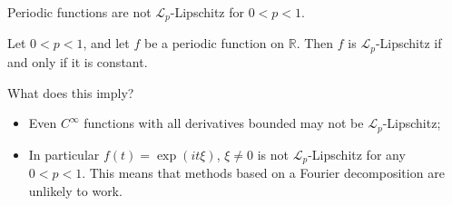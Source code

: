 \documentclass{beamer}
\numberwithin{equation}{section}
\theoremstyle{plain}
\theoremstyle{plain}
\theoremstyle{definition}
\theoremstyle{plain}
\theoremstyle{plain}
\theoremstyle{definition}
\newcommand{\Rl}{\mathbb{R}}
\newcommand{\Itgr}{\mathbb{Z}}
\newcommand{\Circ}{\mathbb{T}}
\newcommand{\Lc}{\mathcal{L}}
\begin{document}
\begin{frame}{Periodic functions are not $\Lc_p$-Lipschitz for $0 < p < 1$.}
    \begin{lemma}
        Let $0 < p < 1$, and let $f$ be a periodic function on $\Rl$. Then $f$ is $\Lc_p$-Lipschitz
        if and only if it is constant.
    \end{lemma}
    What does this imply?\pause
    \begin{itemize}
        \item{} Even $C^\infty$ functions with all derivatives bounded may not be $\Lc_p$-Lipschitz;\\
        \item{} In particular $f(t) = \exp(it\xi)$, $\xi\neq 0$ is not $\Lc_p$-Lipschitz for any $0 < p < 1.$ This means that methods based on a Fourier decomposition
        are unlikely to work.
    \end{itemize}
\end{frame}
\end{document}
